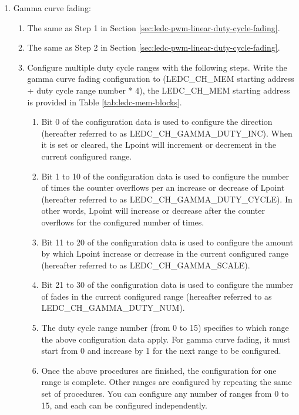 \documentclass[main\_\_EN.tex]{subfiles}
\begin{document}
\begin{enumerate}
\begin{enumerate}
\begin{enumerate}
        \end{enumerate}
        \item Gamma curve fading:
        \begin{enumerate}
            \item The same as Step 1 in Section \ref{sec:ledc-pwm-linear-duty-cycle-fading}.
            \item The same as Step 2 in Section \ref{sec:ledc-pwm-linear-duty-cycle-fading}.
            \item Configure multiple duty cycle ranges with the following steps. Write the gamma curve fading configuration to (LEDC\_CH\_MEM starting address + duty cycle range number * 4), the LEDC\_CH\_MEM starting address is provided in Table \ref{tab:ledc-mem-blocks}.
            \begin{enumerate}
                \item Bit 0 of the configuration data is used to configure the direction (hereafter referred to as LEDC\_CH\_GAMMA\_DUTY\_INC). When it is set or cleared, the Lpoint will increment or decrement in the current configured range.
                \item Bit 1 to 10 of the configuration data is used to configure the number of times the counter overflows per an increase or decrease of Lpoint (hereafter referred to as LEDC\_CH\_GAMMA\_DUTY\_CYCLE). In other words, Lpoint will increase or decrease after the counter overflows for the configured number of times.
                \item Bit 11 to 20 of the configuration data is used to configure the amount by which Lpoint increase or decrease in the current configured range (hereafter referred to as LEDC\_CH\_GAMMA\_SCALE).
                \item Bit 21 to 30 of the configuration data is used to configure the number of fades in the current configured range (hereafter referred to as LEDC\_CH\_GAMMA\_DUTY\_NUM).
                \item The duty cycle range number (from 0 to 15) specifies to which range the above configuration data apply. For gamma curve fading, it must start from 0 and increase by 1 for the next range to be configured.
                \item Once the above procedures are finished, the configuration for one range is complete. Other ranges are configured by repeating the same set of procedures. You can configure any number of ranges from 0 to 15, and each can be configured independently.

\end{enumerate}
\end{enumerate}
\end{enumerate}
\end{enumerate}
\end{document}
